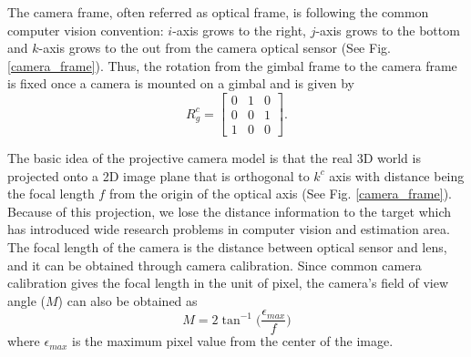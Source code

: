 The camera frame, often referred as optical frame, is following the common computer vision convention: $i$-axis grows to the right, $j$-axis grows to the bottom and $k$-axis grows to the out from the camera optical sensor (See Fig. \ref{camera_frame}). Thus, the rotation from the gimbal frame to the camera frame is fixed once a camera is mounted on a gimbal and is given by 
\begin{equation}
R^{c}_g =
\begin{bmatrix}
0 & 1 & 0 \\
0 & 0 & 1 \\
1 & 0 & 0
\end{bmatrix}.
\label{eq4}
\end{equation}

The basic idea of the projective camera model is that the real 3D world is projected onto a 2D image plane that is orthogonal to $k^c$ axis with distance being the focal length $f$ from the origin of the optical axis (See Fig. \ref{camera_frame}). Because of this projection, we lose the distance information to the target which has introduced wide research problems in computer vision and estimation area. 
The focal length of the camera is the distance between optical sensor and lens, and it can be obtained through camera calibration. Since common camera calibration gives the focal length in the unit of pixel, the camera's field of view angle ($M$) can also be obtained as
\begin{equation}
M=2\tan^{-1}\bigg(\frac{\epsilon_{max}}{f}\bigg)
\end{equation}
where $\epsilon_{max}$ is the maximum pixel value from the center of the image. 

